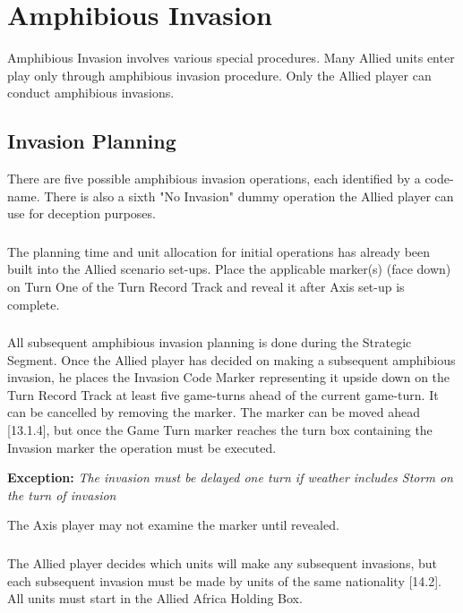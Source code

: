 \section{Amphibious Invasion}

Amphibious Invasion involves various special procedures. Many Allied units enter play only through amphibious invasion procedure. Only the Allied player can conduct amphibious invasions.

\subsection{Invasion Planning}

There are five possible amphibious invasion operations, each identified by a code-name. There is also a sixth "No Invasion" dummy operation the Allied player can use for deception purposes.

\subsubsection{} The planning time and unit allocation for initial operations has already been built into the Allied scenario set-ups. Place the applicable marker(s) (face down) on Turn One of the Turn Record Track and reveal it after Axis set-up is complete.

\subsubsection{} All subsequent amphibious invasion planning is done during the Strategic Segment. Once the Allied player has decided on making a subsequent amphibious invasion, he places the Invasion Code Marker representing it upside down on the Turn Record Track at least five game-turns ahead of the current game-turn. It can be cancelled by removing the marker. The marker can be moved ahead [13.1.4], but once the Game Turn marker reaches the turn box containing the Invasion marker the operation must be executed.

\textbf{Exception:} \textit{The invasion must be delayed one turn if weather includes Storm on the turn of invasion}

The Axis player may not examine the marker until revealed.

\subsubsection{} The Allied player decides which units will make any subsequent invasions, but each subsequent invasion must be made by units of the same nationality [14.2]. All units must start in the Allied Africa Holding Box.

